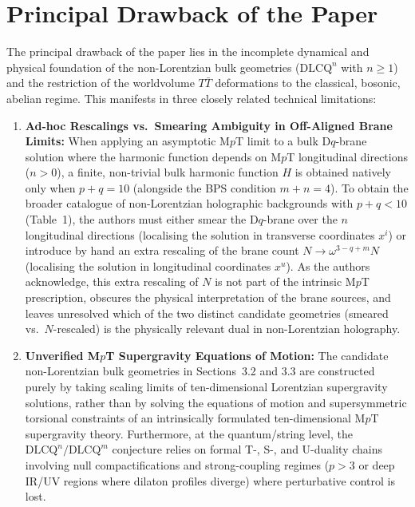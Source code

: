 \documentclass[11pt,a4paper]{article}
\begin{document}
\section{Principal Drawback of the Paper}

The principal drawback of the paper lies in the incomplete dynamical and physical foundation of the non-Lorentzian bulk geometries ($\text{DLCQ}^n$ with $n \ge 1$) and the restriction of the worldvolume $T\bar{T}$ deformations to the classical, bosonic, abelian regime. This manifests in three closely related technical limitations:

\begin{enumerate}
    \item \textbf{Ad-hoc Rescalings vs.\ Smearing Ambiguity in Off-Aligned Brane Limits:} When applying an asymptotic M$p$T limit to a bulk D$q$-brane solution where the harmonic function depends on M$p$T longitudinal directions ($n > 0$), a finite, non-trivial bulk harmonic function $H$ is obtained natively only when $p+q=10$ (alongside the BPS condition $m+n=4$). To obtain the broader catalogue of non-Lorentzian holographic backgrounds with $p+q < 10$ (Table~1), the authors must either smear the D$q$-brane over the $n$ longitudinal directions (localising the solution in transverse coordinates $x^i$) or introduce by hand an extra rescaling of the brane count $N \to \omega^{3-q+m} N$ (localising the solution in longitudinal coordinates $x^u$). As the authors acknowledge, this extra rescaling of $N$ is not part of the intrinsic M$p$T prescription, obscures the physical interpretation of the brane sources, and leaves unresolved which of the two distinct candidate geometries (smeared vs.\ $N$-rescaled) is the physically relevant dual in non-Lorentzian holography.
    
    \item \textbf{Unverified M$p$T Supergravity Equations of Motion:} The candidate non-Lorentzian bulk geometries in Sections~3.2 and 3.3 are constructed purely by taking scaling limits of ten-dimensional Lorentzian supergravity solutions, rather than by solving the equations of motion and supersymmetric torsional constraints of an intrinsically formulated ten-dimensional M$p$T supergravity theory. Furthermore, at the quantum/string level, the $\text{DLCQ}^n/\text{DLCQ}^m$ conjecture relies on formal T-, S-, and U-duality chains involving null compactifications and strong-coupling regimes ($p > 3$ or deep IR/UV regions where dilaton profiles diverge) where perturbative control is lost.
    

\end{enumerate}
\end{document}
